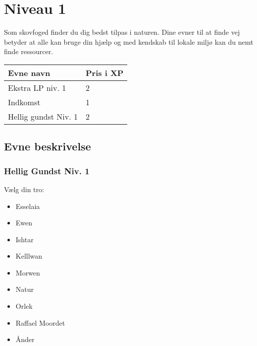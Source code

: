 \chapter{Niveau 1}

Som skovfoged finder du dig bedst tilpas i naturen. Dine evner til at finde vej betyder at alle kan bruge din hjælp og med kendskab til lokale miljø kan du nemt finde ressourcer.

\begin{table}[H]
    \centering
    \begin{tabular}{|p{}|p{}|}
    \rowcolor{cerulean!80}\hline
        Evne navn & Pris i XP \\\hline
        Ekstra LP niv. 1 &2\\\hline 
        Indkomst & 1\\\hline
        Hellig gundst Niv. 1 &2\\\hline
    \end{tabular}
\end{table}

\section{Evne beskrivelse}







\subsection{Hellig Gundst Niv. 1}
Vælg din tro: 
\begin{itemize}
    \item Esselaia
    \item Ewen
    \item Ishtar
    \item Kelllwan
    \item Morwen
    \item Natur
    \item Orlek
    \item Raffael Moordet
    \item Ånder
\end{itemize}

